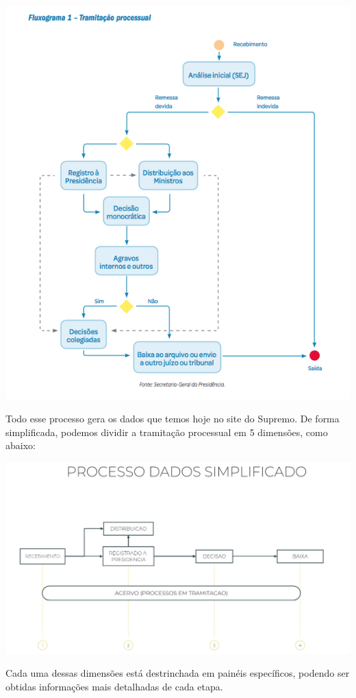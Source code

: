 \documentclass[
]{book}
\begin{document}
\includegraphics[width=1\linewidth]{imagens/fig-cap3-1}

Todo esse processo gera os dados que temos hoje no site do Supremo. De forma simplificada, podemos dividir a tramitação processual em 5 dimensões, como abaixo:

\includegraphics[width=1\linewidth]{imagens/fig-cap3-2}

Cada uma dessas dimensões está destrinchada em painéis específicos, podendo ser obtidas informações mais detalhadas de cada etapa.
\end{document}
